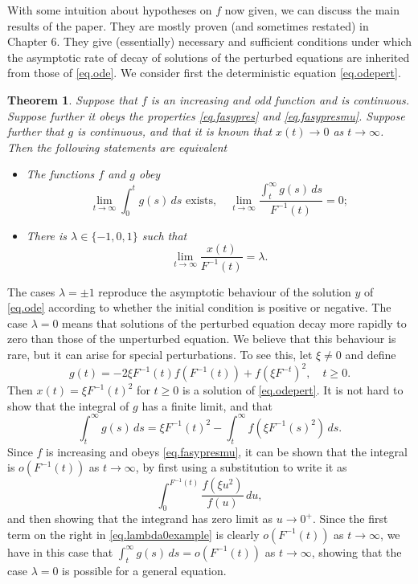 \documentclass[a4paper,10pt,reqno]{amsart}
\numberwithin{equation}{section}
\newtheorem{theorem}{Theorem}
\theoremstyle{definition}
\theoremstyle{remark}
\DeclareMathOperator{\1}{\mathbbm 1}
\begin{document}
	With some intuition about hypotheses on $f$ now given, we can discuss the main results of the paper. They are mostly proven (and sometimes restated) in Chapter 6. They give (essentially) necessary and sufficient conditions under which the asymptotic rate of decay of solutions of the perturbed 
	equations are inherited from those of \eqref{eq.ode}. We consider first the deterministic equation \eqref{eq.odepert}. 
	\begin{theorem} \label{thm.expertodeiff}
		Suppose that $f$ is an increasing and odd function and is continuous. Suppose further it obeys the properties \eqref{eq.fasypres} and \eqref{eq.fasypresmu}. Suppose further that $g$ is continuous, and that it is known that $x(t)\to 0$ as $t\to\infty$. 
		Then the following statements are equivalent
		\begin{itemize}
			\item[(a)] The functions $f$ and $g$ obey
			\[
			\lim_{t\to\infty} \int_0^t g(s)\,ds \text{ exists}, \quad \lim_{t\to\infty} \frac{\int_t^\infty g(s)\,ds}{F^{-1}(t)}=0;
			\]
			\item[(b)] There is $\lambda\in \{-1,0,1\}$ such that
			\[
			\lim_{t\to\infty} \frac{x(t)}{F^{-1}(t)}= \lambda.
			\]
		\end{itemize} 
	\end{theorem}
	The cases $\lambda=\pm 1$ reproduce the asymptotic behaviour of the solution $y$ of \eqref{eq.ode} according to whether the initial condition is positive or 
	negative. The case $\lambda=0$ means that solutions of the perturbed equation decay more rapidly to zero than those of the unperturbed equation. We believe that this behaviour is rare, but it can arise for special perturbations. To see 
	this, let $\xi\neq 0$ and define  
	\[ 
	g(t)=-2\xi F^{-1}(t) f(F^{-1}(t)) + f(\xi F^{-t})^2, \quad t\geq 0.
	\]
	Then $x(t)=\xi F^{-1}(t)^2$ for $t\geq 0$ is a solution of \eqref{eq.odepert}. It is not hard to show that the integral of $g$ has a finite limit, and that 
	\begin{equation} \label{eq.lambda0example}
		\int_t^\infty g(s)\,ds = \xi F^{-1}(t)^2 - \int_t^\infty f(\xi F^{-1}(s)^2)\,ds.
	\end{equation}
	Since $f$ is increasing and obeys \eqref{eq.fasypresmu}, it can be shown that the integral is $o(F^{-1}(t))$ as $t\to\infty$, by first using a substitution to write it as 
	\[
	\int_0^{F^{-1}(t)} \frac{f(\xi u^2)}{f(u)}\,du,
	\]
	and then showing that the integrand has zero limit as $u\to 0^+$. 
	Since the first term on the right in \eqref{eq.lambda0example}  is clearly $o(F^{-1}(t))$ as $t\to\infty$, we have in this case that $\int_t^\infty g(s)\,ds = o(F^{-1}(t))$ as $t\to\infty$, showing that the case $\lambda=0$ is possible for a general equation. 
	
\end{document}
